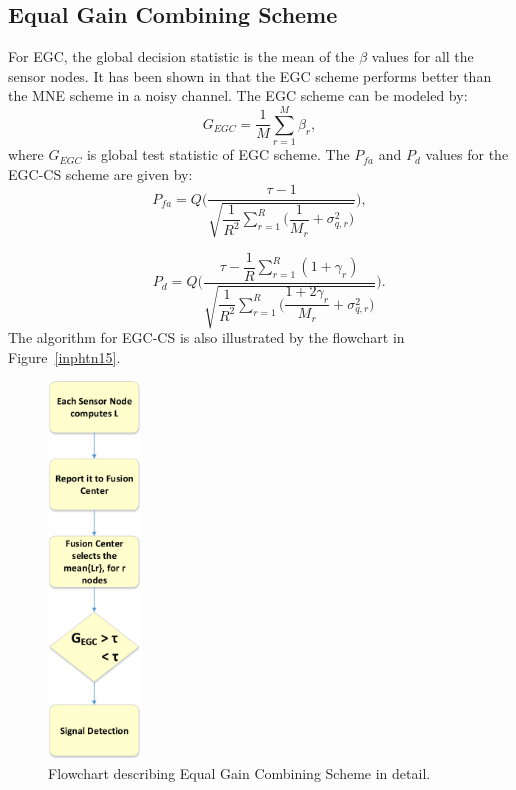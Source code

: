 \subsection{Equal Gain Combining Scheme}

For EGC, the global decision statistic is the mean of the $\beta$ values for all the sensor nodes. It has been shown in \cite{inhtn12} that the EGC scheme performs better than the MNE scheme in a noisy channel. The EGC scheme can be modeled by:
\begin{equation}
	\label{eq:11}
	 G_{EGC} = \dfrac{1}{M}\sum_{r=1}^{M}{\beta_r},
\end{equation}
where $G_{EGC}$ is global test statistic of EGC scheme. The $P_{fa}$ and $P_d$ values for the EGC-CS scheme are given by:
\begin{equation}
\label{eq:12}
P_{fa} = Q\Bigg(\dfrac{\tau-1}{\sqrt{\dfrac{1}{R^2}\sum_{r=1}^{R}\bigg(\dfrac{1}{M_r}+\sigma_{q,r}^2\bigg)}}\Bigg),
\end{equation}

\begin{equation}
\label{eq:13}
~~~~~~P_d = Q\Bigg(\dfrac{\tau-\dfrac{1}{R}\sum_{r=1}^R(1+\gamma_r)}{\sqrt{\dfrac{1}{R^2}\sum_{r=1}^{R}\bigg(\dfrac{1+2\gamma_r}{M_r}+\sigma_{q,r}^2\bigg)}}\Bigg).
\end{equation}
The algorithm for EGC-CS is also illustrated by the flowchart in Figure~\ref{inphtn15}.

\begin{figure}[ht!]
	\centering
	\includegraphics[width=\textwidth,height=10cm,keepaspectratio]{images/Gill/figs/egcscheme.eps}
\caption{Flowchart describing Equal Gain Combining Scheme in detail.} 
\label{egcscheme}      
\end{figure}

